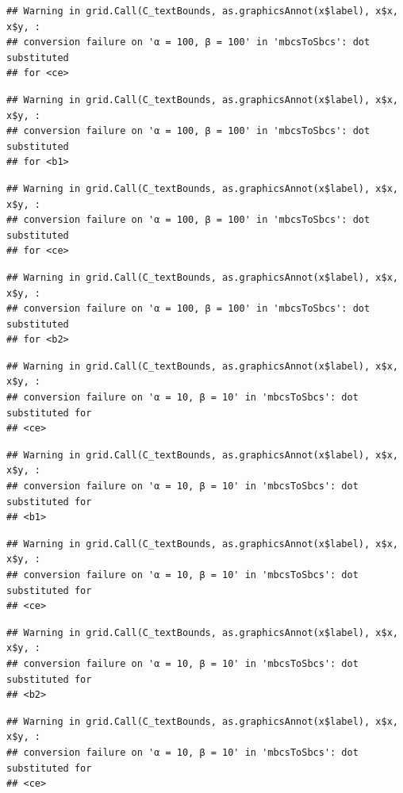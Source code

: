 \documentclass[]{book}
\theoremstyle{definition}
\theoremstyle{definition}
\theoremstyle{definition}
\theoremstyle{remark}
\begin{document}
\begin{verbatim}
## Warning in grid.Call(C_textBounds, as.graphicsAnnot(x$label), x$x, x$y, :
## conversion failure on 'α = 100, β = 100' in 'mbcsToSbcs': dot substituted
## for <ce>
\end{verbatim}

\begin{verbatim}
## Warning in grid.Call(C_textBounds, as.graphicsAnnot(x$label), x$x, x$y, :
## conversion failure on 'α = 100, β = 100' in 'mbcsToSbcs': dot substituted
## for <b1>
\end{verbatim}

\begin{verbatim}
## Warning in grid.Call(C_textBounds, as.graphicsAnnot(x$label), x$x, x$y, :
## conversion failure on 'α = 100, β = 100' in 'mbcsToSbcs': dot substituted
## for <ce>
\end{verbatim}

\begin{verbatim}
## Warning in grid.Call(C_textBounds, as.graphicsAnnot(x$label), x$x, x$y, :
## conversion failure on 'α = 100, β = 100' in 'mbcsToSbcs': dot substituted
## for <b2>
\end{verbatim}

\begin{verbatim}
## Warning in grid.Call(C_textBounds, as.graphicsAnnot(x$label), x$x, x$y, :
## conversion failure on 'α = 10, β = 10' in 'mbcsToSbcs': dot substituted for
## <ce>
\end{verbatim}

\begin{verbatim}
## Warning in grid.Call(C_textBounds, as.graphicsAnnot(x$label), x$x, x$y, :
## conversion failure on 'α = 10, β = 10' in 'mbcsToSbcs': dot substituted for
## <b1>
\end{verbatim}

\begin{verbatim}
## Warning in grid.Call(C_textBounds, as.graphicsAnnot(x$label), x$x, x$y, :
## conversion failure on 'α = 10, β = 10' in 'mbcsToSbcs': dot substituted for
## <ce>
\end{verbatim}

\begin{verbatim}
## Warning in grid.Call(C_textBounds, as.graphicsAnnot(x$label), x$x, x$y, :
## conversion failure on 'α = 10, β = 10' in 'mbcsToSbcs': dot substituted for
## <b2>
\end{verbatim}

\begin{verbatim}
## Warning in grid.Call(C_textBounds, as.graphicsAnnot(x$label), x$x, x$y, :
## conversion failure on 'α = 10, β = 10' in 'mbcsToSbcs': dot substituted for
## <ce>
\end{verbatim}
\end{document}
